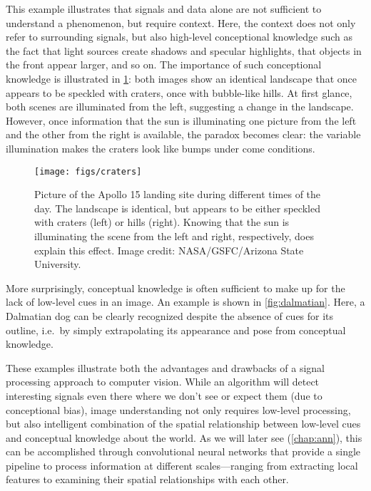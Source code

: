 This example illustrates that signals and data alone are not sufficient to understand a phenomenon, but require context. Here, the context does not only refer to surrounding signals, but also high-level conceptional knowledge such as the fact that light sources create shadows and specular highlights, that objects in the front appear larger, and so on. The importance of such conceptional knowledge is illustrated in \cref{fig:craters}:
both images show an identical landscape that once appears to be speckled with craters, once with bubble-like hills. At first glance, both scenes are illuminated from the left, suggesting a change in the landscape. However, once information that the sun is illuminating one picture from the left and the other from the right is available, the paradox becomes clear: the variable illumination makes the craters look like bumps under come conditions.

\begin{figure}[!htb]
    \centering
    \texttt{[image: figs/craters]}
    \caption{Picture of the Apollo 15 landing site during different times of the day. The landscape is identical, but appears to be either speckled with craters (left) or hills (right). Knowing that the sun is illuminating the scene from the left and right, respectively, does explain this effect. Image credit: NASA/GSFC/Arizona State University.
    \label{fig:craters}}
\end{figure}

More surprisingly, conceptual knowledge is often sufficient to make up for the lack of low-level cues in an image. An example is shown in \cref{fig:dalmatian}. Here, a Dalmatian dog can be clearly recognized despite the absence of cues for its outline, i.e.\ by simply extrapolating its appearance and pose from conceptual knowledge.

These examples illustrate both the advantages and drawbacks of a signal processing approach to computer vision. While an algorithm will detect interesting signals even there where we don't see or expect them (due to conceptional bias), image understanding not only requires low-level processing, but also intelligent combination of the spatial relationship between low-level cues and conceptual knowledge about the world. As we will later see (\cref{chap:ann}), this can be accomplished through convolutional neural networks that provide a single pipeline to process information at different scales---ranging from extracting local features to examining their spatial relationships with each other.

